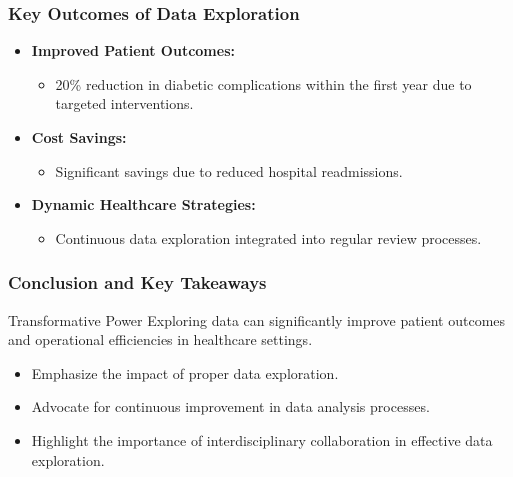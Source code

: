 \documentclass[aspectratio=169]{beamer}
\begin{document}
\begin{frame}[fragile]
    \frametitle{Key Outcomes of Data Exploration}
    \begin{itemize}
        \item \textbf{Improved Patient Outcomes:}
            \begin{itemize}
                \item 20\% reduction in diabetic complications within the first year due to targeted interventions.
            \end{itemize}
        \item \textbf{Cost Savings:}
            \begin{itemize}
                \item Significant savings due to reduced hospital readmissions.
            \end{itemize}
        \item \textbf{Dynamic Healthcare Strategies:}
            \begin{itemize}
                \item Continuous data exploration integrated into regular review processes.
            \end{itemize}
    \end{itemize}
\end{frame}

\begin{frame}[fragile]
    \frametitle{Conclusion and Key Takeaways}
    \begin{block}{Transformative Power}
        Exploring data can significantly improve patient outcomes and operational efficiencies in healthcare settings.
    \end{block}
    \begin{itemize}
        \item Emphasize the impact of proper data exploration.
        \item Advocate for continuous improvement in data analysis processes.
        \item Highlight the importance of interdisciplinary collaboration in effective data exploration.
    \end{itemize}
\end{frame}
\end{document}
